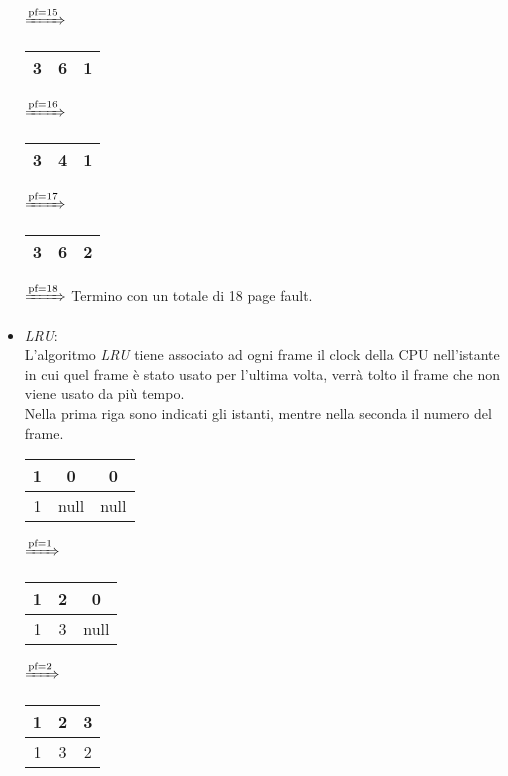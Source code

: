 \documentclass{article}
\begin{document}
\begin{itemize}
\begin{tabular}{|c|c|c|}
                \hline
            \end{tabular}
            $\xRightarrow{\text{pf}=15}$
            \begin{tabular}{|c|c|c|}
                \hline
                3 & 6 & 1\\
                \hline
            \end{tabular}
            $\xRightarrow{\text{pf}=16}$
            \begin{tabular}{|c|c|c|}
                \hline
                3 & 4 & 1\\
                \hline
            \end{tabular}
            $\xRightarrow{\text{pf}=17}$
            \begin{tabular}{|c|c|c|}
                \hline
                3 & 6 & 2\\
                \hline
            \end{tabular}
            $\xRightarrow{\text{pf}=18}$
            Termino con un totale di 18 page fault.
        \item \emph{LRU}:\\
            L'algoritmo \emph{LRU} tiene associato ad ogni frame il clock della CPU nell'istante in cui quel frame è stato usato per l'ultima volta, verrà tolto il frame che non viene usato da più tempo.\\
            Nella prima riga sono indicati gli istanti, mentre nella seconda il numero del frame.\\
            \begin{tabular}{|c|c|c|}
                \hline
                1 & 0 & 0\\
                \hline
                1 & null & null\\
                \hline
            \end{tabular}
            $\xRightarrow{\text{pf}=1}$
            \begin{tabular}{|c|c|c|}
                \hline
                1 & 2 & 0\\
                \hline
                1 & 3 & null\\
                \hline
            \end{tabular}
            $\xRightarrow{\text{pf}=2}$
            \begin{tabular}{|c|c|c|}
                \hline
                1 & 2 & 3\\
                \hline
                1 & 3 & 2\\

\end{tabular}
\end{itemize}
\end{document}
